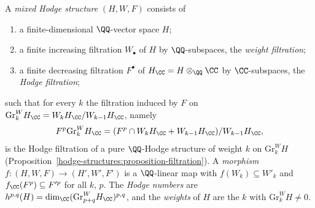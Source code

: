 \begin{definition}\label{mixed-hodge-structures:definition-mhs}
A \emph{mixed Hodge structure} $(H, W, F)$ consists of
\begin{enumerate}
\item a finite-dimensional $\QQ$-vector space $H$;
\item a finite increasing filtration $W_\bullet$ of $H$ by $\QQ$-subspaces, the \emph{weight filtration};
\item a finite decreasing filtration $F^\bullet$ of $H_\CC = H \otimes_\QQ \CC$ by $\CC$-subspaces, the \emph{Hodge filtration};
\end{enumerate}
such that for every $k$ the filtration induced by $F$ on $\mathrm{Gr}^W_kH_\CC = W_kH_\CC/W_{k-1}H_\CC$, namely
\[
F^p\mathrm{Gr}^W_kH_\CC = (F^p \cap W_kH_\CC + W_{k-1}H_\CC)/W_{k-1}H_\CC,
\]
is the Hodge filtration of a pure $\QQ$-Hodge structure of weight $k$ on $\mathrm{Gr}^W_kH$ (Proposition~\ref{hodge-structures:proposition-filtration}). A \emph{morphism}
$f \colon (H, W, F) \to (H', W', F')$ is a $\QQ$-linear map with $f(W_k) \subseteq W'_k$ and $f_\CC(F^p) \subseteq F'^p$ for all $k$, $p$. The \emph{Hodge numbers} are
$h^{p,q}(H) = \dim_\CC(\mathrm{Gr}^W_{p+q}H_\CC)^{p,q}$, and the \emph{weights} of $H$ are the $k$ with $\mathrm{Gr}^W_kH \neq 0$.
\end{definition}

